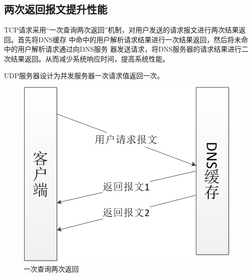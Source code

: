 \subsection{两次返回报文提升性能}
TCP请求采用“一次查询两次返回”机制，对用户发送的请求报文进行两次结果返回。首先将DNS缓存
中命中的用户解析请求结果进行一次结果返回，然后将未命中的用户解析请求通过向DNS服务
器发送请求，将DNS服务器的请求结果进行二次结果返回。从而减少系统响应时间，提高系统性能。
\par{UDP服务器设计为并发服务器一次请求值返回一次。}
\begin{figure}[H]                                                                                                                                       
\centering
\includegraphics[keepaspectratio, scale=0.8]{pitures/one_req_2_rep.png}
\caption{一次查询两次返回} 
\end{figure}

%
